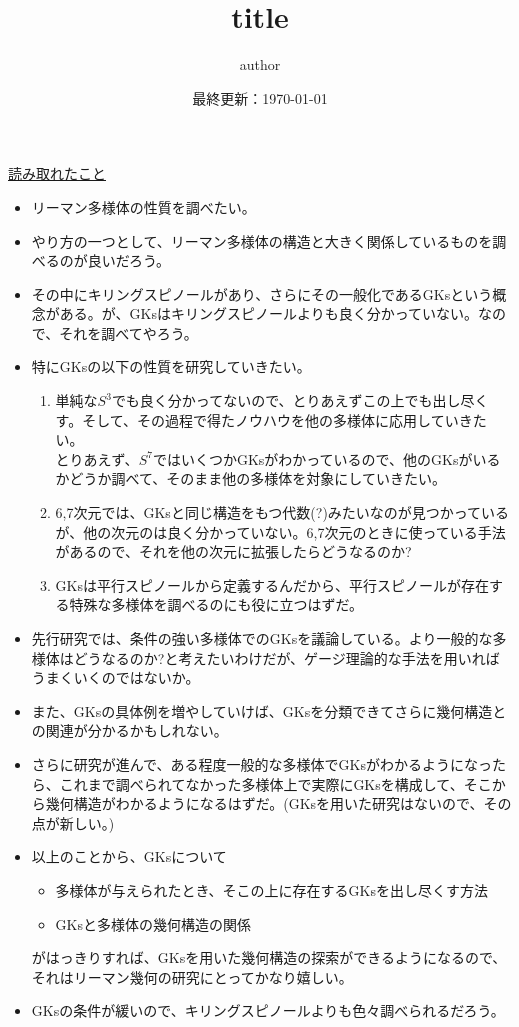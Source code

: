 \documentclass[unicode,a4paper,10pt]{ltjsarticle}
\title{
  title
}
\author{
  author
}
\date{最終更新：\today}
\theoremstyle{definition}
\begin{document}
\uline{読み取れたこと}

\begin{itemize}
  \item 
  リーマン多様体の性質を調べたい。
  \item 
  やり方の一つとして、リーマン多様体の構造と大きく関係しているものを調べるのが良いだろう。
  \item 
  その中にキリングスピノールがあり、さらにその一般化であるGKsという概念がある。が、GKsはキリングスピノールよりも良く分かっていない。なので、それを調べてやろう。
  \item 
  特にGKsの以下の性質を研究していきたい。
  \begin{enumerate}
    \item 
    単純な$S^{3}$でも良く分かってないので、とりあえずこの上でも出し尽くす。そして、その過程で得たノウハウを他の多様体に応用していきたい。\\
    とりあえず、$S^{7}$ではいくつかGKsがわかっているので、他のGKsがいるかどうか調べて、そのまま他の多様体を対象にしていきたい。
    \item 
    6,7次元では、GKsと同じ構造をもつ代数(?)みたいなのが見つかっているが、他の次元のは良く分かっていない。6,7次元のときに使っている手法があるので、それを他の次元に拡張したらどうなるのか?
    \item 
    GKsは平行スピノールから定義するんだから、平行スピノールが存在する特殊な多様体を調べるのにも役に立つはずだ。
  \end{enumerate}
  \item 
  先行研究では、条件の強い多様体でのGKsを議論している。より一般的な多様体はどうなるのか?と考えたいわけだが、ゲージ理論的な手法を用いればうまくいくのではないか。
  \item 
  また、GKsの具体例を増やしていけば、GKsを分類できてさらに幾何構造との関連が分かるかもしれない。
  \item 
  さらに研究が進んで、ある程度一般的な多様体でGKsがわかるようになったら、これまで調べられてなかった多様体上で実際にGKsを構成して、そこから幾何構造がわかるようになるはずだ。(GKsを用いた研究はないので、その点が新しい。)
  \item 
  以上のことから、GKsについて
  \begin{itemize}
    \item 
    多様体が与えられたとき、そこの上に存在するGKsを出し尽くす方法
    \item 
    GKsと多様体の幾何構造の関係
  \end{itemize}
  がはっきりすれば、GKsを用いた幾何構造の探索ができるようになるので、それはリーマン幾何の研究にとってかなり嬉しい。
  \item 
  GKsの条件が緩いので、キリングスピノールよりも色々調べられるだろう。
\end{itemize}
\end{document}
